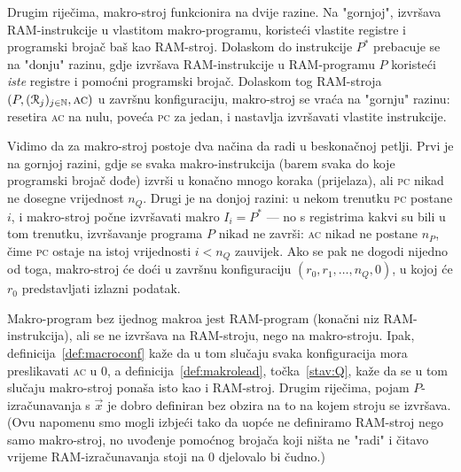 Drugim riječima, makro-stroj funkcionira na dvije razine. Na "gornjoj", izvršava RAM-instrukcije u vlastitom makro-programu, koristeći vlastite registre i programski brojač baš kao RAM-stroj. Dolaskom do instrukcije $P^*$ prebacuje se na "donju" razinu, gdje izvršava RAM-instrukcije u RAM-programu $P$ koristeći \emph{iste} registre i pomoćni programski brojač. Dolaskom tog RAM-stroja $(P,(\mathcal R_{j})_{j\in{\mathbb N}},\textsc{ac})$ u završnu konfiguraciju, makro-stroj se vraća na "gornju" razinu: resetira \textsc{ac} na nulu, poveća \textsc{pc} za jedan, i nastavlja izvršavati vlastite instrukcije.

Vidimo da za makro-stroj postoje dva načina da radi u beskonačnoj petlji. Prvi je na gornjoj razini, gdje se svaka makro-instrukcija (barem svaka do koje programski brojač dođe) izvrši u konačno mnogo koraka (prijelaza), ali \textsc{pc} nikad ne dosegne vrijednost $n_Q$. Drugi je na donjoj razini: u nekom trenutku \textsc{pc} postane $i$, i makro-stroj počne izvršavati makro $I_i=P^*$ --- no s registrima kakvi su bili u tom trenutku, izvršavanje programa $P$ nikad ne završi: \textsc{ac} nikad ne postane $n_P$, čime \textsc{pc} ostaje na istoj vrijednosti $i<n_Q$ zauvijek. Ako se pak ne dogodi nijedno od toga, makro-stroj će doći u završnu konfiguraciju $(r_0,r_1,\dotsc,n_Q,0)$, u kojoj će $r_0$ predstavljati izlazni podatak.

\begin{napomena}[{name=[svaki RAM-program je makro-program]}]\label{nap:rem}
Makro-program bez ijednog makroa jest RAM-program (konačni niz RAM-instrukcija), ali se ne izvršava na RAM-stroju, nego na makro-stroju. Ipak, definicija~\ref{def:macroconf} kaže da u tom slučaju svaka konfiguracija mora preslikavati \textsc{ac} u $0$, a definicija~\ref{def:makrolead}, točka~\ref{stav:Q}, kaže da se u tom slučaju makro-stroj ponaša isto kao i RAM-stroj. Drugim riječima, pojam $P$-izračunavanja s $\vec x$ je dobro definiran bez obzira na to na kojem stroju se izvršava. (Ovu napomenu smo mogli izbjeći tako da uopće ne definiramo RAM-stroj nego samo makro-stroj, no uvođenje pomoćnog brojača koji ništa ne "radi" i čitavo vrijeme RAM-izračunavanja stoji na $0$ djelovalo bi čudno.)
\end{napomena}

